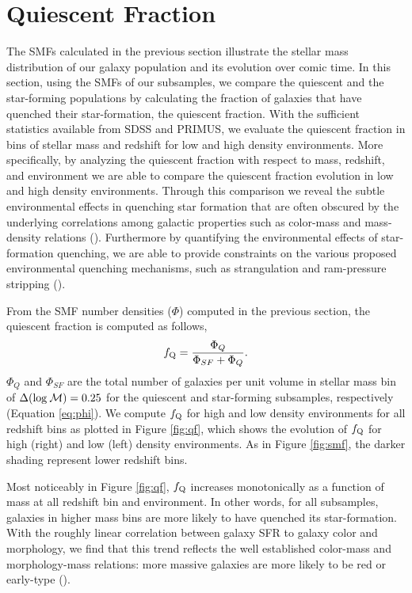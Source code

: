 \documentclass{emulateapj}
\begin{document}
\section{Quiescent Fraction} \label{sec:qf_const}
The SMFs calculated in the previous section illustrate the stellar mass distribution of our galaxy population and its evolution over comic time. In this section, using the SMFs of our subsamples, we compare the quiescent and the star-forming populations by calculating the fraction of galaxies that have quenched their star-formation, the quiescent fraction. With the sufficient statistics available from SDSS and PRIMUS, we evaluate the quiescent fraction in bins of stellar mass and redshift for low and high density environments. More specifically, by analyzing the quiescent fraction with respect to mass, redshift, and environment we are able to compare the quiescent fraction evolution in low and high density environments. Through this comparison we reveal the subtle environmental effects in quenching star formation that are often obscured by the underlying correlations among galactic properties such as color-mass and mass-density relations (\cite{Cooper:2010aa}). Furthermore by quantifying the environmental effects of star-formation quenching, we are able to provide constraints on the various proposed environmental quenching mechanisms, such as strangulation and ram-pressure stripping (\cite{McCarthy:2008aa}).

From the SMF number densities ($\Phi$) computed in the previous section, the quiescent fraction is computed as follows, 
\begin{equation}
f_{\rm{Q}} = \frac{\Phi_{Q}}{\Phi_{SF}+\Phi_{Q}}.
\end{equation}
$\Phi_{Q}$ and $\Phi_{SF}$ are the total number of galaxies per unit volume in stellar mass bin of $\Delta(\rm{log} \: \mathcal{M}) = 0.25$ for the quiescent and star-forming subsamples, respectively (Equation \ref{eq:phi}). We compute $f_{\rm{Q}}$ for high and low density environments for all redshift bins as plotted in Figure \ref{fig:qf}, which shows the evolution of $f_{\rm{Q}}$ for high (right) and low (left) density environments. As in Figure \ref{fig:smf}, the darker shading represent lower redshift bins. 

Most noticeably in Figure \ref{fig:qf}, $f_{\rm{Q}}$ increases monotonically as a function of mass at all redshift bin and environment. In other words, for all subsamples, galaxies in higher mass bins are more likely to have quenched its star-formation. With the roughly linear correlation between galaxy SFR to galaxy color and morphology, we find that this trend reflects the well established color-mass and morphology-mass relations: more massive galaxies are more likely to be red or early-type (\cite{blanton09a}). 
\end{document}
